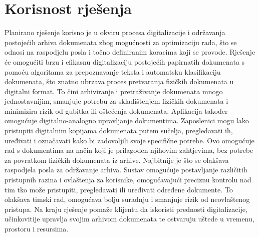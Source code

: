 		\section{Korisnost rješenja}
		Planirano rješenje korisno je u okviru procesa digitalizacije i održavanja postojećih arhiva dokumenata zbog mogućnosti za optimizaciju rada, što se odnosi na raspodjelu posla i točno definiranim koracima koji se provode. Rješenje će omogućiti brzu i efikasnu digitalizaciju postojećih papirnatih dokumenata s pomoću algoritama za prepoznavanje teksta i automatsku klasifikaciju dokumenata, što znatno ubrzava proces pretvaranja fizičkih dokumenata u digitalni format. To čini arhiviranje i pretraživanje dokumenata mnogo jednostavnijim, smanjuje potrebu za skladištenjem fizičkih dokumenata i minimizira rizik od gubitka ili oštećenja dokumenata. Aplikacija također omogućuje digitalno-analogno upravljanje dokumentima. Zaposlenici mogu lako pristupiti digitalnim kopijama dokumenata putem sučelja, pregledavati ih, uređivati i označavati kako bi zadovoljili svoje specifične potrebe. Ovo omogućuje rad s dokumentima na način koji je prilagođen njihovim zahtjevima, bez potrebe za povratkom fizičkih dokumenata iz arhive. Najbitnije je što se olakšava raspodjela posla za održavanje arhiva. Sustav omogućuje postavljanje različitih pristupnih razina i ovlaštenja za korisnike, omogućavajući preciznu kontrolu nad tim tko može pristupiti, pregledavati ili uređivati određene dokumente. To olakšava timski rad, omogućava bolju suradnju i smanjuje rizik od neovlaštenog pristupa. Na kraju rješenje pomaže klijentu da iskoristi prednosti digitalizacije, učinkovitije upravlja svojim arhivom dokumenata te ostvaruju uštede u vremenu, prostoru i resursima.
		\eject
		

